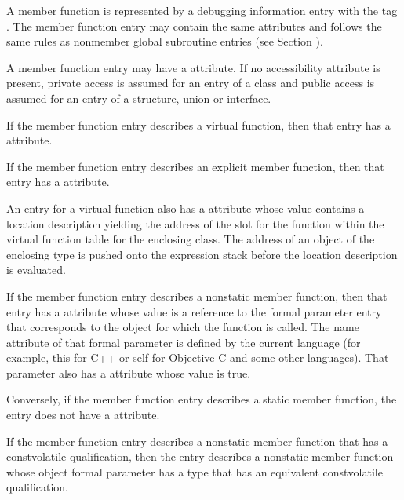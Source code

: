 A member function is represented by a debugging information
entry with the tag . The member function entry
may contain the same attributes and follows the same rules
as non\dash member global subroutine entries 
(see Section ).

A member function entry may have a 
attribute. If no accessibility attribute is present, private
access is assumed for an entry of a class and public access
is assumed for an entry of a structure, union or interface.

If the member function entry describes a virtual function,
then that entry has a  attribute.

If the member function entry describes an explicit member
function, then that entry has a  attribute.

An entry for a virtual function also has a
 attribute whose value contains
a location description yielding the address of the slot
for the function within the virtual function table for the
enclosing class. The address of an object of the enclosing
type is pushed onto the expression stack before the location
description is evaluated.

If the member function entry describes a non\dash static member
function, then that entry has a  attribute
whose value is a reference to the formal parameter entry
that corresponds to the object for which the function is
called. The name attribute of that formal parameter is defined
by the current language (for example, this for C++ or self
for Objective C and some other languages). That parameter
also has a  attribute whose value is true.

Conversely, if the member function entry describes a static
member function, the entry does not have a 
attribute.

If the member function entry describes a non\dash static member
function that has a const\dash volatile qualification, then
the entry describes a non\dash static member function whose
object formal parameter has a type that has an equivalent
const\dash volatile qualification.

